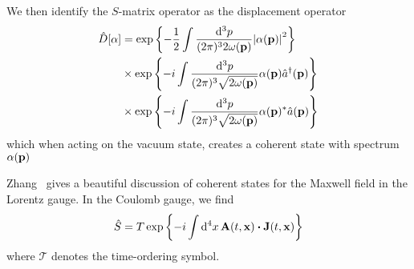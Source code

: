 We then identify the $S$-matrix operator as the displacement operator
\begin{equation}
	\begin{split}
		\hat{D}[\alpha]
		&=
		\exp\left\{
			-
			\frac{1}{2}
			\int\frac{\dd[3]{p}}{(2\pi)^32\omega(\vb{p})}
			\abs{\alpha(\vb{p})}^2
		\right\}
		\\
		&\times
		\exp\left\{
			-i
			\int\frac{\dd[3]{p}}{(2\pi)^3\sqrt{2\omega(\vb{p})}}
			\alpha(\vb{p})
			\hat{a}^\dagger(\vb{p})
		\right\}
		\\
		&\times
		\exp\left\{
			-i
			\int\frac{\dd[3]{p}}{(2\pi)^3\sqrt{2\omega(\vb{p})}}
			\alpha(\vb{p})^*
			\hat{a}(\vb{p})
		\right\}
	\end{split}
\end{equation}
which when acting on the vacuum state, creates a coherent state with spectrum $\alpha(\vb{p})$

Zhang~\cite{Zhang1999} gives a beautiful discussion of coherent states for the Maxwell field in the Lorentz gauge.
In the Coulomb gauge, we find
\begin{equation}
	\hat{S}
	=
	T
	\exp\left\{
		-i\int\dd[4]{x}
		\vb{A}(t,\vb{x})\vdot\vb{J}(t,\vb{x})
	\right\}
\end{equation}
where $\mathcal{T}$ denotes the time-ordering symbol.